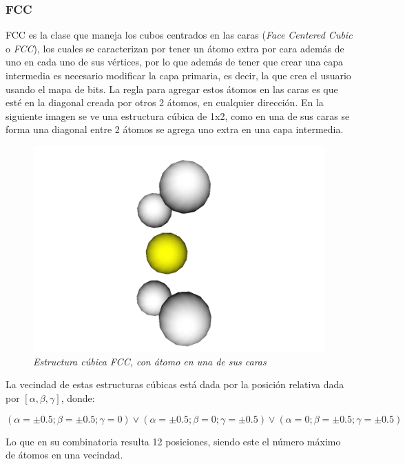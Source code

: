 \subsubsection{FCC}
FCC es la clase que maneja los cubos centrados en las caras (\emph{Face Centered Cubic} o \emph{FCC}), los cuales se caracterizan por tener un átomo extra por cara además de uno en cada uno de sus vértices, por lo que además de tener que crear una capa intermedia es necesario modificar la capa primaria, es decir, la que crea el usuario usando el mapa de bits. La regla para agregar estos átomos en las caras es que esté en la diagonal creada por otros 2 átomos, en cualquier dirección. En la siguiente imagen se ve una estructura cúbica de 1x2, como en una de sus caras se forma una diagonal entre 2 átomos se agrega uno extra en una capa intermedia.

\begin{figure}[H]
  \centering
  \includegraphics[scale=.3]{images/FCC-diagonal}
  \caption{\em Estructura cúbica FCC, con átomo en una de sus caras}
\end{figure}

La vecindad de estas estructuras cúbicas está dada por la posición relativa dada por $[\alpha, \beta, \gamma]$, donde:

$$ (\alpha = \pm 0.5; \beta = \pm 0.5; \gamma = 0) \vee (\alpha = \pm 0.5; \beta = 0; \gamma = \pm 0.5) \vee (\alpha = 0; \beta = \pm 0.5; \gamma = \pm 0.5)$$

Lo que en su combinatoria resulta 12 posiciones, siendo este el número máximo de átomos en una vecindad.